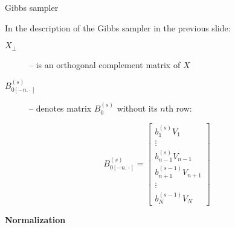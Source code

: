 \documentclass[notes,blackandwhite,mathsans,usenames,dvipsnames]{beamer}
\begin{document}
\begin{frame}{Gibbs sampler}

{\color{mcxs2}In the description of the Gibbs sampler in the previous slide:}
\begin{description}
\item[$X_{\bot}$] {\color{mcxs2}-- is an orthogonal complement matrix of} $X$ 
\item[$B_{0[-n.\cdot]}^{(s)}$] {\color{mcxs2}-- denotes matrix} $B_{0}^{(s)}$ {\color{mcxs2}without its $n$th row:}
\end{description}

\small
$$ B_{0[-n.\cdot]}^{(s)} = \begin{bmatrix} b_1^{(s)}V_1\\ \vdots \\ b_{n-1}^{(s)}V_{n-1}\\b_{n+1}^{(s-1)}V_{n+1}\\ \vdots \\ b_N^{(s-1)}V_N \end{bmatrix}
$$

\end{frame}





{
\begin{frame}

\begin{adjustwidth}{-0.5cm}{0cm}
\vspace{8.3cm}\Large
\textbf{{\color{lightgray}} {\color{mcxs1}Normalization}}
\end{adjustwidth}

\end{frame}
}


%
%
\end{document}
